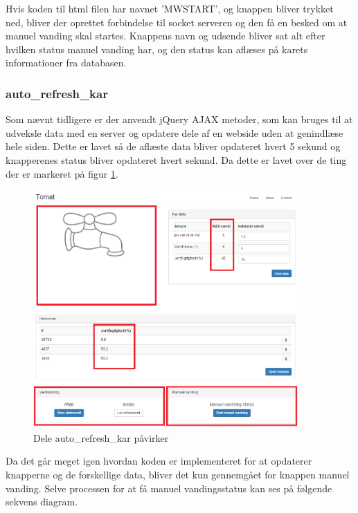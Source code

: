 Hvis koden til html filen har navnet 'MWSTART', og knappen bliver trykket ned, bliver der oprettet forbindelse til socket serveren og den få en besked om at manuel vanding skal startes. Knappens navn og udsende bliver sat alt efter hvilken status manuel vanding har, og den status kan aflæses på karets informationer fra databasen.


\subsubsection{auto\_refresh\_kar} 
Som nævnt tidligere er der anvendt jQuery AJAX metoder, som kan bruges til at udveksle data med en server og opdatere dele af en webside uden at genindlæse hele siden. Dette er lavet så de aflæste data bliver opdateret hvert 5 sekund og knapperenes status bliver opdateret hvert sekund. Da dette er lavet over de ting der er markeret på figur \ref{fig:auto}.  

\begin{figure}[H]
    \centering
    \includegraphics[width=0.9\textwidth]{SoftwareArkitektur/GUI/Controller/photo/auto.PNG}
    \caption{Dele auto\_refresh\_kar påvirker}
    \label{fig:auto}
\end{figure}

Da det går meget igen hvordan koden er implementeret for at opdaterer knapperne og de forskellige data, bliver det kun gennemgået for knappen manuel vanding. Selve processen for at få manuel vandingsstatus kan ses på følgende sekvens diagram.

